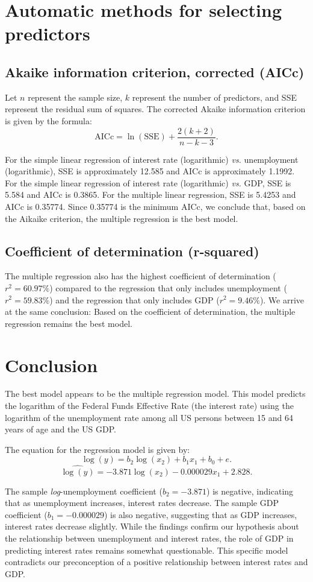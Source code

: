 \documentclass[12pt]{article}
\begin{document}
\section{Automatic methods for selecting predictors}
\subsection{Akaike information criterion, corrected (AICc)}
Let $n$ represent the sample size, $k$ represent the number of predictors, and SSE represent the residual sum of squares. The corrected Akaike information criterion is given by the formula:
\[\mathrm{AICc}=\ln(\mathrm{SSE})+\frac{2(k+2)}{n-k-3}.\]

For the simple linear regression of interest rate (logarithmic) \textit{vs.} unemployment (logarithmic), SSE is approximately 12.585 and AICc is approximately 1.1992. For the simple linear regression of interest rate (logarithmic) \textit{vs.} GDP, SSE is 5.584 and AICc is 0.3865. For the multiple linear regression, SSE is 5.4253 and AICc is 0.35774. Since 0.35774 is the minimum AICc, we conclude that, based on the Aikaike criterion, the multiple regression is the best model.
\subsection{Coefficient of determination (r-squared)}
The multiple regression also has the highest coefficient of determination ($r^2=60.97\%$) compared to the regression that only includes unemployment ($r^2=59.83\%$) and the regression that only includes GDP ($r^2=9.46\%$). We arrive at the same conclusion: Based on the coefficient of determination, the multiple regression remains the best model.
\section{Conclusion}
The best model appears to be the multiple regression model. This model predicts the logarithm of the Federal Funds Effective Rate (the interest rate) using the logarithm of the unemployment rate among all US persons between 15 and 64 years of age and the US GDP.

The equation for the regression model is given by:
\[\log(y)=b_2\log(x_2)+b_1x_1+b_0+e.\]
\[\widehat{\log(y)}=-3.871\log(x_2)-0.000029x_1+2.828.\]

The sample \textit{log}-unemployment coefficient ($b_2=-3.871$) is negative, indicating that as unemployment increases, interest rates decrease. The sample GDP coefficient ($b_1=-0.000029$) is also negative, suggesting that as GDP increases, interest rates decrease slightly. While the findings confirm our hypothesis about the relationship between unemployment and interest rates, the role of GDP in predicting interest rates remains somewhat questionable. This specific model contradicts our preconception of a positive relationship between interest rates and GDP.
\end{document}
